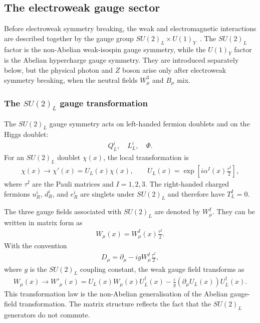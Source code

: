 \subsection{The electroweak gauge sector}
\label{subsec:electroweak_gauge_sector}

Before electroweak symmetry breaking, the weak and electromagnetic interactions are described together by the gauge group $SU(2)_{L}\times U(1)_{Y}$~\cite{Glashow1961,Weinberg1967,Salam1968}. 
The $SU(2)_{L}$ factor is the non-Abelian weak-isospin gauge symmetry, while the $U(1)_{Y}$ factor is the Abelian hypercharge gauge symmetry. 
They are introduced separately below, but the physical photon and $Z$ boson arise only after electroweak symmetry breaking, when the neutral fields $W_{\mu}^{3}$ and $B_{\mu}$ mix.


\subsubsection{The $SU(2)_{L}$ gauge transformation}
\label{subsec:su2l_transformation}

The $SU(2)_{L}$ gauge symmetry acts on left-handed fermion doublets and on the Higgs doublet:
\begin{align}
    Q_{L}^{i},
    \quad
    L_{L}^{i},
    \quad
    \Phi.
\end{align}
For an $SU(2)_{L}$ doublet $\chi(x)$, the local transformation is
\begin{align}
    \chi(x)
    \rightarrow
    \chi'(x)
    =
    U_{L}(x)\chi(x),
    \qquad
    U_{L}(x)
    =
    \exp\left[
        i\alpha^{I}(x)\frac{\tau^{I}}{2}
    \right],
    \label{eq:su2l_matter_transformation}
\end{align}
where $\tau^{I}$ are the Pauli matrices and $I=1,2,3$. 
The right-handed charged fermions $u_{R}^{i}$, $d_{R}^{i}$, and $e_{R}^{i}$ are singlets under $SU(2)_{L}$ and therefore have $T_{L}^{I}=0$.

The three gauge fields associated with $SU(2)_{L}$ are denoted by $W_{\mu}^{I}$. 
They can be written in matrix form as
\begin{align}
    W_{\mu}(x)
    =
    W_{\mu}^{I}(x)\frac{\tau^{I}}{2}.
    \label{eq:weak_gauge_field_matrix}
\end{align}
With the convention
\begin{align}
    D_{\mu}
    =
    \partial_{\mu}
    -
    igW_{\mu}^{I}\frac{\tau^{I}}{2},
    \label{eq:su2l_covariant_derivative}
\end{align}
where $g$ is the $SU(2)_{L}$ coupling constant, the weak gauge field transforms as
\begin{align}
    W_{\mu}(x)
    \rightarrow
    W'_{\mu}(x)
    =
    U_{L}(x)W_{\mu}(x)U_{L}^{\dagger}(x)
    -
    \frac{i}{g}
    \left(\partial_{\mu}U_{L}(x)\right)U_{L}^{\dagger}(x).
    \label{eq:su2l_gauge_field_transformation}
\end{align}
This transformation law is the non-Abelian generalisation of the Abelian gauge-field transformation. 
The matrix structure reflects the fact that the $SU(2)_{L}$ generators do not commute.

